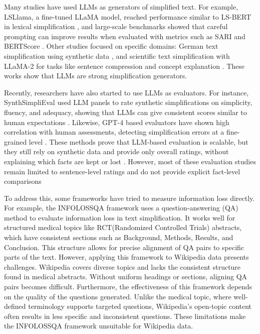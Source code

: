 \documentclass{DESSThesis}
\begin{document}
Many studies have used LLMs as generators of simplified text. For example, LSLlama, a fine-tuned LLaMA model, reached performance similar to LS-BERT in lexical simplification \cite{baez-saggion-2023-lsllama}, and large-scale benchmarks showed that careful prompting can improve results when evaluated with metrics such as SARI and BERTScore \cite{kew2023bless}. Other studies focused on specific domains: German text simplification using synthetic data \cite{kloser-etal-2024-german}, and scientific text simplification with LLaMA-2 for tasks like sentence compression and concept explanation \cite{mann2024clef}. These works show that LLMs are strong simplification generators.  

Recently, researchers have also started to use LLMs as evaluators\cite{shen2023large,cachola2025evaluating}. For instance, SynthSimpliEval used LLM panels to rate synthetic simplifications on simplicity, fluency, and adequacy, showing that LLMs can give consistent scores similar to human expectations \cite{liu2025evaluation}. Likewise, GPT-4 based evaluators have shown high correlation with human assessments, detecting simplification errors at a fine-grained level \cite{wu2025indepthevaluationlargelanguage}. These methods prove that LLM-based evaluation is scalable, but they still rely on synthetic data and provide only overall ratings, without explaining which facts are kept or lost \cite{wu2025indepthevaluationlargelanguage}. However, most of these evaluation studies remain limited to sentence-level ratings and do not provide explicit fact-level comparisons \cite{wu2025indepthevaluationlargelanguage}

To address this, some frameworks have tried to measure information loss directly. For example, the INFOLOSSQA framework \cite{trienes2024infolossqacharacterizingrecoveringinformation} uses a question-answering (QA) method to evaluate information loss in text simplification. It works well for structured medical topics like RCT(Randomized Controlled Trials) abstracts, which have consistent sections such as Background, Methods, Results, and Conclusion. This structure allows for precise alignment of QA pairs to specific parts of the text. However, applying this framework to Wikipedia data presents challenges. Wikipedia covers diverse topics and lacks the consistent structure found in medical abstracts. Without uniform headings or sections, aligning QA pairs becomes difficult. Furthermore, the effectiveness of this framework depends on the quality of the questions generated. Unlike the medical topic, where well-defined terminology supports targeted questions, Wikipedia's open-topic content often results in less specific and inconsistent questions. These limitations make the INFOLOSSQA framework unsuitable for Wikipedia data.  
\end{document}
